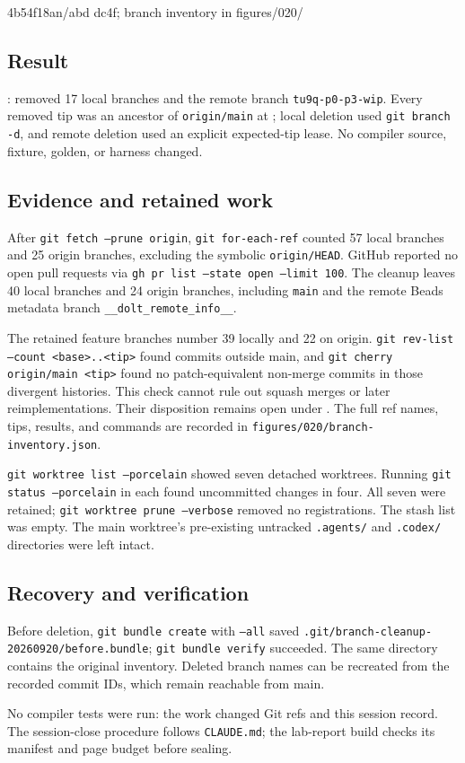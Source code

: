 %
  {4b54f18a}{n/a}{bd dc4f; branch inventory in figures/020/}

\subsection*{Result}
: removed 17 local branches and the remote branch
\texttt{tu9q-p0-p3-wip}. Every removed tip was an ancestor of
\texttt{origin/main} at ; local deletion used
\texttt{git branch -d}, and remote deletion used an explicit expected-tip
lease. No compiler source, fixture, golden, or harness changed.

\subsection*{Evidence and retained work}
After \texttt{git fetch --prune origin}, \texttt{git for-each-ref} counted
57 local branches and 25 origin branches, excluding the symbolic
\texttt{origin/HEAD}. GitHub reported no open pull requests via
\texttt{gh pr list --state open --limit 100}. The cleanup leaves 40 local
branches and 24 origin branches, including \texttt{main} and the remote
Beads metadata branch \texttt{\_\_dolt\_remote\_info\_\_}.

The retained feature branches number 39 locally and 22 on origin.
\texttt{git rev-list --count <base>..<tip>} found commits outside main,
and \texttt{git cherry origin/main <tip>} found no patch-equivalent
non-merge commits in those divergent histories. This check cannot rule
out squash merges or later reimplementations. Their disposition remains
open under . The full ref names, tips, results, and commands are
recorded in \texttt{figures/020/branch-inventory.json}.

\texttt{git worktree list --porcelain} showed seven detached worktrees.
Running \texttt{git status --porcelain} in each found uncommitted changes
in four. All seven were retained; \texttt{git worktree prune --verbose}
removed no registrations. The stash list was empty. The main worktree's
pre-existing untracked \texttt{.agents/} and \texttt{.codex/} directories
were left intact.

\subsection*{Recovery and verification}
Before deletion, \texttt{git bundle create} with \texttt{--all} saved
\texttt{.git/branch-cleanup-20260920/before.bundle};
\texttt{git bundle verify} succeeded. The same directory contains the
original inventory. Deleted branch names can be recreated from the recorded
commit IDs, which remain reachable from main.

No compiler tests were run: the work changed Git refs and this session
record. The session-close procedure follows \texttt{CLAUDE.md}; the
lab-report build checks its manifest and page budget before sealing.
